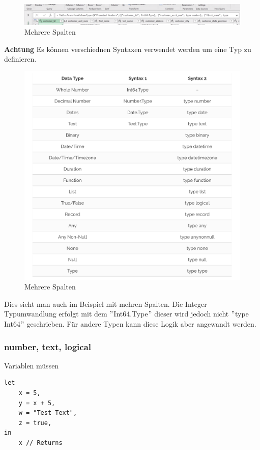 \begin{figure}[H]
	\centering
	\includegraphics[scale = 0.3]{attachment/chapter_1/screenshot034}
	\caption{Mehrere Spalten}
	\label{fig:screenshot034}
\end{figure}

\textbf{Achtung} Es können verschiednen Syntaxen verwendet werden um eine Typ zu definieren. 
\begin{figure}[H]
	\centering
	\includegraphics[scale = 0.3]{attachment/chapter_1/screenshot035}
	\caption{Mehrere Spalten}
	\label{fig:screenshot035}
\end{figure}
Dies sieht man auch im Beispiel mit mehren Spalten. Die Integer Typumwandlung erfolgt mit dem $"$Int64.Type$"$ dieser wird jedoch nicht $"$type Int64$"$ geschrieben. Für andere Typen kann diese Logik aber angewandt werden.

\subsubsection{number, text, logical}
Variablen müssen 
\begin{lstlisting}[style=M]
let
	x = 5,
	y = x + 5, 
	w = "Test Text",
	z = true,
in 
	x // Returns 
\end{lstlisting}

